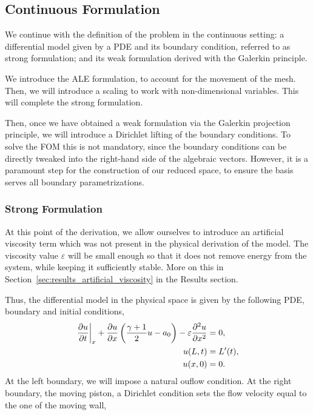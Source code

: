 \documentclass[../../thesis.tex]{subfiles}
\begin{document}
\subsection{Continuous Formulation}
We continue with the definition of the problem in the continuous setting: 
a differential model given by a PDE and its boundary condition, referred to as {strong formulation}; 
and its weak formulation derived with the Galerkin principle.

We introduce the ALE formulation, to account for the movement of the mesh.
Then, we will introduce a scaling to work with non-dimensional variables.
This will complete the strong formulation.

Then, once we have obtained a weak formulation via the Galerkin projection principle,
we will introduce a Dirichlet lifting of the boundary conditions.
To solve the FOM this is not mandatory, since the boundary conditions can be 
directly tweaked into the right-hand side of the algebraic vectors.
However, it is a paramount step for the construction of our reduced space,
to ensure the basis serves all boundary parametrizations.

\subsubsection{Strong Formulation}
At this point of the derivation, we allow ourselves to introduce an artificial viscosity term which was not present in the physical derivation of the model.
The viscosity value $\varepsilon$ will be small enough so that it does not remove energy from the system,
while keeping it sufficiently stable. 
More on this in Section~\ref{sec:results_artificial_viscosity} in the Results section.


Thus, the differential model in the physical space is given by the following PDE, boundary and initial conditions,
\begin{subequations}
    \begin{align}
        \left.\frac{\partial u}{\partial t}\right|_{x} 
        + \frac{\partial u}{\partial x}\left(\frac{\gamma+1}{2}u - a_0\right) 
        - \varepsilon \pdv[2]{u}{x} &= 0, \label{eq:1d_fom_strong_pde} \\
        u(L, t) &= L'(t),
        \\
        u(x, 0) &= 0. 
    \end{align}
\end{subequations}
At the left boundary, we will impose a natural ouflow condition.
At the right boundary, the moving piston, a Dirichlet condition sets the flow velocity equal to the one of the moving wall,
\end{document}
